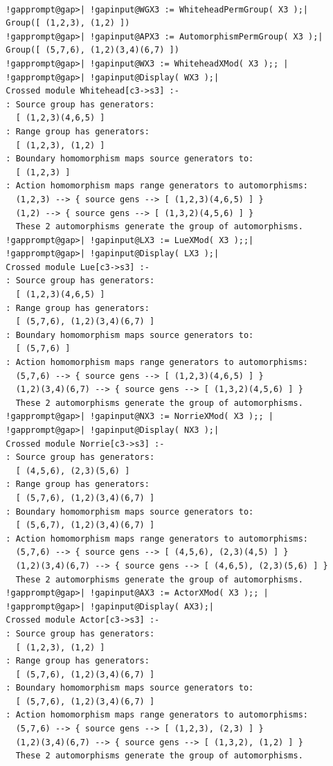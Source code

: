 \documentclass[a4paper,11pt]{report}
\begin{document}
{{ 
\begin{Verbatim}[commandchars=!@|,fontsize=\small,frame=single,label=Example]
  
  !gapprompt@gap>| !gapinput@WGX3 := WhiteheadPermGroup( X3 );|
  Group([ (1,2,3), (1,2) ])
  !gapprompt@gap>| !gapinput@APX3 := AutomorphismPermGroup( X3 );|
  Group([ (5,7,6), (1,2)(3,4)(6,7) ])
  !gapprompt@gap>| !gapinput@WX3 := WhiteheadXMod( X3 );; |
  !gapprompt@gap>| !gapinput@Display( WX3 );|
  Crossed module Whitehead[c3->s3] :- 
  : Source group has generators:
    [ (1,2,3)(4,6,5) ]
  : Range group has generators:
    [ (1,2,3), (1,2) ]
  : Boundary homomorphism maps source generators to:
    [ (1,2,3) ]
  : Action homomorphism maps range generators to automorphisms:
    (1,2,3) --> { source gens --> [ (1,2,3)(4,6,5) ] }
    (1,2) --> { source gens --> [ (1,3,2)(4,5,6) ] }
    These 2 automorphisms generate the group of automorphisms.
  !gapprompt@gap>| !gapinput@LX3 := LueXMod( X3 );;|
  !gapprompt@gap>| !gapinput@Display( LX3 );|
  Crossed module Lue[c3->s3] :- 
  : Source group has generators:
    [ (1,2,3)(4,6,5) ]
  : Range group has generators:
    [ (5,7,6), (1,2)(3,4)(6,7) ]
  : Boundary homomorphism maps source generators to:
    [ (5,7,6) ]
  : Action homomorphism maps range generators to automorphisms:
    (5,7,6) --> { source gens --> [ (1,2,3)(4,6,5) ] }
    (1,2)(3,4)(6,7) --> { source gens --> [ (1,3,2)(4,5,6) ] }
    These 2 automorphisms generate the group of automorphisms.
  !gapprompt@gap>| !gapinput@NX3 := NorrieXMod( X3 );; |
  !gapprompt@gap>| !gapinput@Display( NX3 );|
  Crossed module Norrie[c3->s3] :- 
  : Source group has generators:
    [ (4,5,6), (2,3)(5,6) ]
  : Range group has generators:
    [ (5,7,6), (1,2)(3,4)(6,7) ]
  : Boundary homomorphism maps source generators to:
    [ (5,6,7), (1,2)(3,4)(6,7) ]
  : Action homomorphism maps range generators to automorphisms:
    (5,7,6) --> { source gens --> [ (4,5,6), (2,3)(4,5) ] }
    (1,2)(3,4)(6,7) --> { source gens --> [ (4,6,5), (2,3)(5,6) ] }
    These 2 automorphisms generate the group of automorphisms.
  !gapprompt@gap>| !gapinput@AX3 := ActorXMod( X3 );; |
  !gapprompt@gap>| !gapinput@Display( AX3);|
  Crossed module Actor[c3->s3] :- 
  : Source group has generators:
    [ (1,2,3), (1,2) ]
  : Range group has generators:
    [ (5,7,6), (1,2)(3,4)(6,7) ]
  : Boundary homomorphism maps source generators to:
    [ (5,7,6), (1,2)(3,4)(6,7) ]
  : Action homomorphism maps range generators to automorphisms:
    (5,7,6) --> { source gens --> [ (1,2,3), (2,3) ] }
    (1,2)(3,4)(6,7) --> { source gens --> [ (1,3,2), (1,2) ] }
    These 2 automorphisms generate the group of automorphisms.
  

\end{Verbatim}}}
\end{document}
